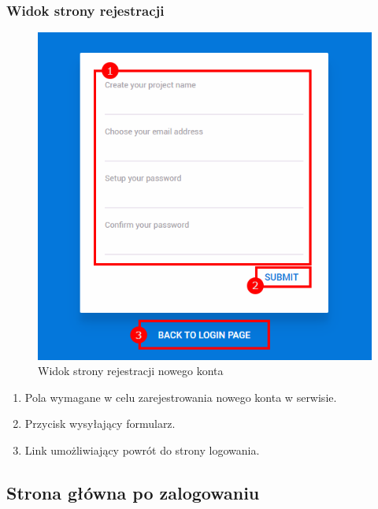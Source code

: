 \documentclass[eng,printmode]{mgr}
\begin{document}
\subsubsection{Widok strony rejestracji}
\begin{figure}[H]
  \begin{center}
  \includegraphics[scale=0.8]{register}
  \end{center}
  \caption{Widok strony rejestracji nowego konta}
\end{figure}

\begin{enumerate}
  \item Pola wymagane w celu zarejestrowania nowego konta w serwisie. 
  \item Przycisk wysyłający formularz.
  \item Link umożliwiający powrót do strony logowania.
\end{enumerate}
\newpage

\subsection{Strona główna po zalogowaniu}
\end{document}
